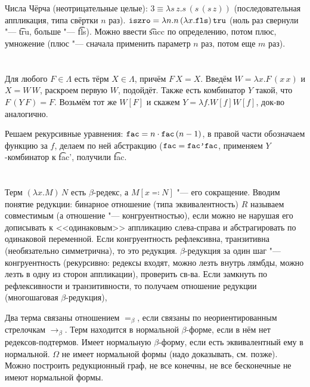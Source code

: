 \section{} %
Числа Чёрча (неотрицательные целые): $3\equiv \lambda s\,z.s\,(s\,(s\,z))$ (последовательная аппликация,
типа свёртки $n$ раз).
$\texttt{iszro}=\lambda n . n\,(\lambda x.\texttt{fls})\,\texttt{tru}$ (ноль раз свернули "--- \t{tru}, больше "--- \t{fls}).
Можно ввести \t{succ} по определению, потом плюс, умножение (плюс "--- сначала применить параметр $n$
раз, потом еще $m$ раз).

\section{} %
Для любого $F \in \Lambda$ есть тёрм $X \in \Lambda$, причём $F\, X = X$.
Введём $W=\lambda x . F\,(x\,x)$ и $X=W\,W$, раскроем первую $W$, подойдёт.
Также есть комбинатор $Y$ такой, что $F\,(Y\,F)=F$.
Возьмём тот же $W[F]$ и скажем $Y = \lambda f . W[f] W[f]$, док-во аналогично.

Решаем рекурсивные уравнения: $\texttt{fac} = n \cdot \texttt{fac}\,(n-1)$,
в правой части обозначаем функцию за $f$, делаем по ней абстракцию ($\texttt{fac} = \texttt{fac'} \texttt{fac}$,
применяем $Y$-комбинатор к \t{fac'}, получили \t{fac}.

\section{} %
Терм $(\lambda x . M)\, N$ есть $\beta$-редекс,	а $M[x \eqcolon N]$ "--- его сокращение.
Вводим понятие редукции: бинарное отношение (типа эквивалентность) $R$ называем совместимым
(а отношение "--- конгруентностью), если
можно не нарушая его дописывать к <<одинаковым>> аппликацию слева-справа и абстрагировать по одинаковой переменной.
Если конгруентность рефлексивна, транзитивна (необязательно симметрична), то это редукция.
$\beta$-редукция за один шаг "--- конгруентность (рекурсивно: редексы входят, можно лезть внутрь лямбды,
можно лезть в одну из сторон аппликации), проверить св-ва.
Если замкнуть по рефлексивности и транзитивности, то получаем отношение редукции (многошаговая $\beta$-редукция),

Два терма связаны отношением $=_\beta$, если связаны по неориентированным стрелочкам $\to_\beta$.
Терм находится в нормальной $\beta$-форме, если в нём нет редексов-подтермов.
Имеет нормальную $\beta$-форму, если есть эквивалентный ему в нормальной.
$\Omega$ не имеет нормальной формы (надо доказывать, см. позже).
Можно построить редукционный граф, не все конечны, не все бесконечные не имеют нормальной формы.

